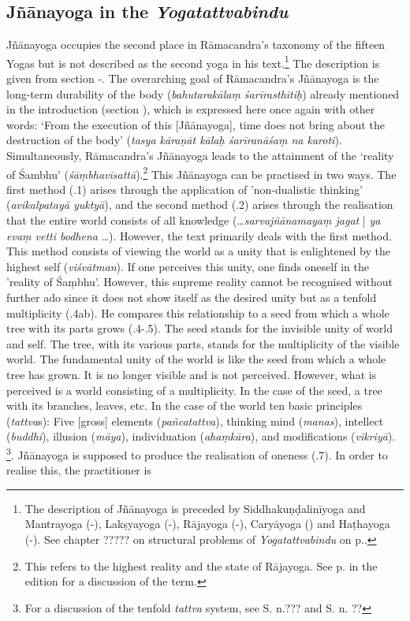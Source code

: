 \subsection{Jñānayoga in the \textit{Yogatattvabindu}}
\label{Jnanayogaintro2}
Jñānayoga occupies the second place in Rāmacandra's taxonomy of the fifteen Yogas but is not described as the second yoga in his text.\footnote{The description of Jñānayoga is preceded by Siddhakuṇḍalinīyoga and Mantrayoga (-), Lakṣyayoga (-), Rājayoga (-), Caryāyoga () and Haṭhayoga (-). See chapter ????? on structural problems of \textit{Yogatattvabindu} on p.\pageref{structuralissues}.} The description is given from section -. The overarching goal of Rāmacandra's Jñānayoga is the long-term durability of the body (\textit{bahutarakālaṃ śarīrasthitiḥ}) already mentioned in the introduction (section ), which is expressed here once again with other words: `From the execution of this [Jñānayoga], time does not bring about the destruction of the body' (\textit{tasya kāraṇāt kālaḥ śarīranāśaṃ na karoti}). Simultaneously, Rāmacandra's Jñānayoga leads to the attainment of the `reality of Śambhu' (\textit{śāṃbhavīsattā}).\footnote{This refers to the highest reality and the state of Rājayoga. See p.\pageref{jnanayogatrans1} in the edition for a discussion of the term.} This Jñānayoga can be practised in two ways. The first method (.1) arises through the application of 'non-dualistic thinking' (\textit{avikalpatayā yuktyā}), and the second method (.2) arises through the realisation that the entire world consists of all knowledge (\ldots \textit{sarvajñānamayaṃ jagat} | \textit{ya evaṃ vetti bodhena} \ldots). However, the text primarily deals with the first method. This method consists of viewing the world as a unity that is enlightened by the highest self (\textit{viśvātman}). If one perceives this unity, one finds oneself in the 'reality of Śaṃbhu'. However, this supreme reality cannot be recognised without further ado since it does not show itself as the desired unity but as a tenfold multiplicity (.4ab). He compares this relationship to a seed from which a whole tree with its parts grows (.4-.5). The seed stands for the invisible unity of world and self. The tree, with its various parts, stands for the multiplicity of the visible world. The fundamental unity of the world is like the seed from which a whole tree has grown. It is no longer visible and is not perceived. However, what is perceived is a world consisting of a multiplicity. In the case of the seed, a tree with its branches, leaves, etc. In the case of the world ten basic principles (\textit{tattva}s): Five [gross] elements (\textit{pañcatattva}), thinking mind (\textit{manas}), intellect (\textit{buddhi}), illusion (\textit{māya}), individuation (\textit{ahaṃkāra}), and modifications (\textit{vikriyā}). \footnote{For a discussion of the tenfold \textit{tattva} system, see S.\pageref{??} n.??? and S.\pageref{??} n. ??}. Jñānayoga is supposed to produce the realisation of oneness (.7). In order to realise this, the practitioner is 